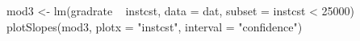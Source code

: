 \begin{Schunk}
\begin{Sinput}
 mod3 <- lm(gradrate ~ instcst, data = dat, subset = instcst < 25000)
 plotSlopes(mod3, plotx = "instcst", interval = "confidence")
\end{Sinput}
\end{Schunk}
